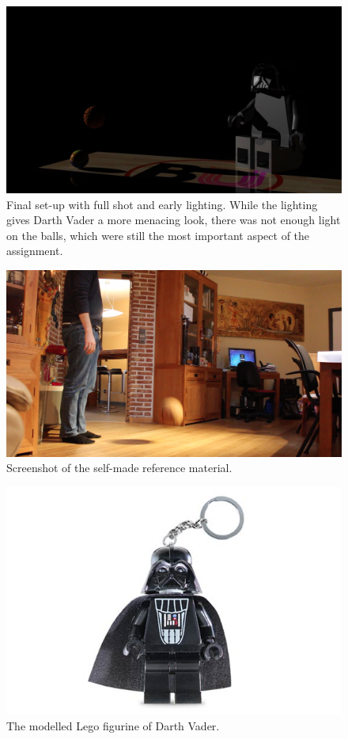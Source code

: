 \documentclass[12pt,a4paper]{article}
\begin{document}
\begin{figure}
\center
\includegraphics[scale=0.25 ]{images/earlyLighting.jpg} 
\caption{Final set-up with full shot and early lighting. While the lighting gives Darth Vader a more menacing look, there was not enough light on the balls, which were still the most important aspect of the assignment.}
\label{img_earlyLight}
\end{figure}

\begin{figure}
\center
\includegraphics[scale=0.25 ]{images/reference.png} 
\caption{Screenshot of the self-made reference material.}
\label{img_reference}
\end{figure}

\begin{figure}
\center
\includegraphics[scale=0.5]{images/vader.jpg} 
\caption{The modelled Lego figurine of Darth Vader.}
\label{img_vader}
\end{figure}
\end{document}
